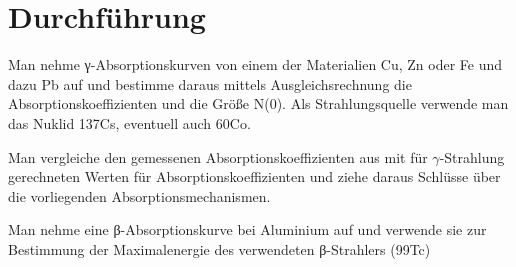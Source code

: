\section{Durchf\"uhrung}
\label{sec:Durchfuehrung}

Man nehme γ-Absorptionskurven von einem der Materialien Cu, Zn oder Fe und dazu Pb auf und bestimme daraus mittels Ausgleichsrechnung die Absorptionskoeffizienten und die Größe N(0). 
Als Strahlungsquelle verwende man das Nuklid 137Cs, eventuell auch 60Co. 

Man vergleiche den gemessenen Absorptionskoeffizienten aus mit für \texorpdfstring{$\gamma$}{Gamma}-Strahlung gerechneten Werten für Absorptionskoeffizienten und ziehe daraus Schlüsse über die vorliegenden Absorptionsmechanismen. 

Man nehme eine β-Absorptionskurve bei Aluminium auf und verwende sie zur Bestimmung der Maximalenergie des verwendeten β-Strahlers (99Tc)